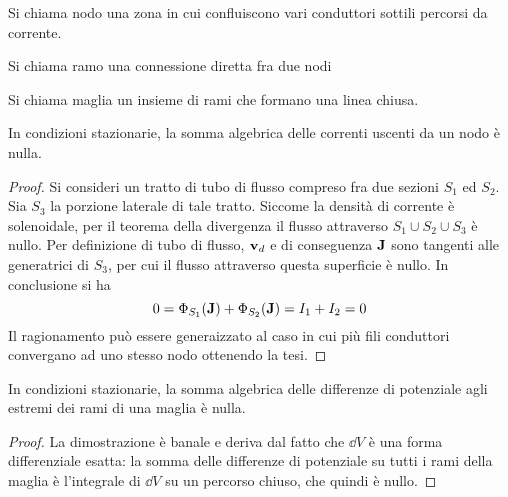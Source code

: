 \begin{defn}[Nodo]
    Si chiama nodo una zona in cui confluiscono vari conduttori sottili percorsi da corrente.
\end{defn}

\begin{defn}[Ramo]
    Si chiama ramo una connessione diretta fra due nodi
\end{defn}

\begin{defn}[Maglia]
    Si chiama maglia un insieme di rami che formano una linea chiusa.
\end{defn}

\begin{thm}
    In condizioni stazionarie, la somma algebrica delle correnti uscenti da un nodo è nulla.
\end{thm}
\begin{proof}
    Si consideri un tratto di tubo di flusso compreso fra due sezioni $S_1$ ed $S_2$.
    Sia $S_3$ la porzione laterale di tale tratto. Siccome la densità di corrente è solenoidale,
    per il teorema della divergenza il flusso attraverso $S_1 \cup S_2 \cup S_3$ è nullo.
    Per definizione di tubo di flusso, $\vb{v}_d$ e di conseguenza $\vb{J}$ sono tangenti alle generatrici di $S_3$,
    per cui il flusso attraverso questa superficie è nullo. In conclusione si ha
    \[
        0=\Phi_{S_1}(\vb{J})+\Phi_{S_2}(\vb{J})=I_1+I_2=0
    \]
    Il ragionamento può essere generaizzato al caso in cui più fili conduttori convergano ad uno stesso nodo ottenendo la tesi.
\end{proof}

\begin{thm}
    In condizioni stazionarie, la somma algebrica delle differenze di potenziale agli estremi dei rami di una maglia è nulla.
\end{thm}
\begin{proof}
    La dimostrazione è banale e deriva dal fatto che $\dd{V}$ è una forma differenziale esatta:
    la somma delle differenze di potenziale su tutti i rami della maglia è l'integrale di $\dd{V}$ su un percorso chiuso, che quindi è nullo.
\end{proof}
